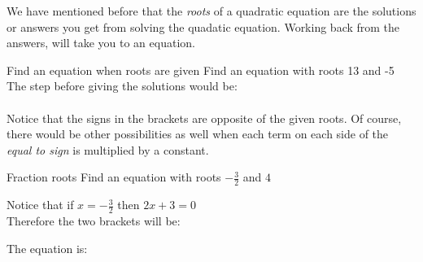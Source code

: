 We have mentioned before that the \textit{roots} of a quadratic equation are the solutions or answers you get from solving the quadatic equation.  Working back from the answers, will take you to an equation.

\begin{wex}{Find an equation when roots are given}
{Find an equation with roots 13 and -5}{
The step before giving the solutions would be:\\
\\
Notice that the signs in the brackets are opposite of the given roots.
Of course, there would be other possibilities as well when each term on each side of the \textit{equal to sign} is multiplied by a constant.}
\end{wex}

\begin{wex}{Fraction roots}
{Find an equation with roots $-\frac{3}{2}$  and $4$}{
Notice that if $x = -\frac{3}{2}$ then $2x + 3 = 0$\\
Therefore the two brackets will be:\\

The equation is:\\
}
\end{wex}

